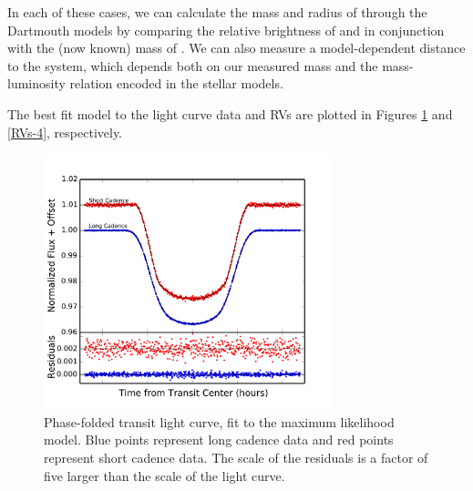 In each of these cases, we can calculate the mass and radius of \LB{} through the Dartmouth models by comparing the relative brightness of \LA{} and \LB{} in conjunction with the (now known) mass of \LA. 
We can also measure a model-dependent distance to the system, which depends both on our measured mass and the mass-luminosity relation encoded in the stellar models.

The best fit model to the light curve data and RVs are plotted in Figures \ref{LC} and \ref{RVs-4}, respectively.


\begin{figure}[htbp]
\centerline{\includegraphics[width=0.75\textwidth]{chapter4/f4.pdf}}
\caption[Phase-folded transit light curve, fit to the maximum likelihood model]{Phase-folded transit light curve, fit to the maximum likelihood model.
Blue points represent long cadence data and red points represent short cadence data.
The scale of the residuals is a factor of five larger than the scale of the light curve.
  }
\label{LC}
\end{figure}


